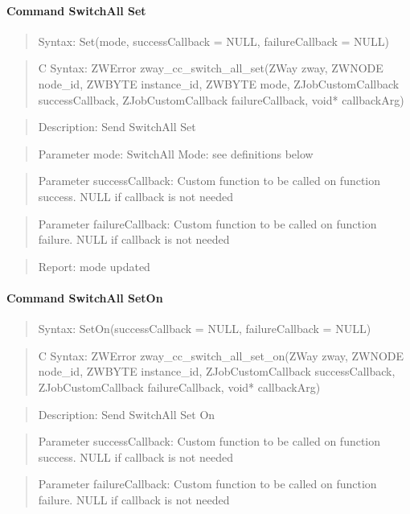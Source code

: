 \paragraph{Command SwitchAll Set}
\begin{quote}Syntax: Set(mode, successCallback = NULL, failureCallback = NULL)\end{quote}
\begin{quote}C Syntax: ZWError zway\_cc\_switch\_all\_set(ZWay zway, ZWNODE node\_id, ZWBYTE instance\_id, ZWBYTE mode, ZJobCustomCallback successCallback, ZJobCustomCallback failureCallback, void* callbackArg)\end{quote}
\begin{quote}Description: Send SwitchAll Set\end{quote}
\begin{quote}Parameter mode: SwitchAll Mode: see definitions below\end{quote}
\begin{quote}Parameter successCallback: Custom function to be called on function success. NULL if callback is not needed\end{quote}
\begin{quote}Parameter failureCallback: Custom function to be called on function failure. NULL if callback is not needed\end{quote}
\begin{quote}Report: mode updated\end{quote}

\paragraph{Command SwitchAll SetOn}
\begin{quote}Syntax: SetOn(successCallback = NULL, failureCallback = NULL)\end{quote}
\begin{quote}C Syntax: ZWError zway\_cc\_switch\_all\_set\_on(ZWay zway, ZWNODE node\_id, ZWBYTE instance\_id, ZJobCustomCallback successCallback, ZJobCustomCallback failureCallback, void* callbackArg)\end{quote}
\begin{quote}Description: Send SwitchAll Set On\end{quote}
\begin{quote}Parameter successCallback: Custom function to be called on function success. NULL if callback is not needed\end{quote}
\begin{quote}Parameter failureCallback: Custom function to be called on function failure. NULL if callback is not needed\end{quote}



